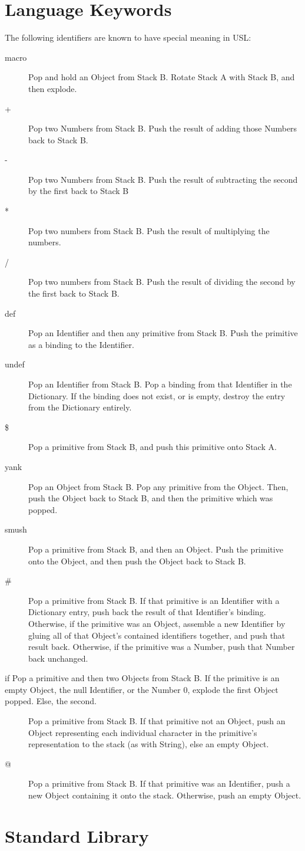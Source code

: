 	\section{Language Keywords}
	The following identifiers are known to have special meaning in USL:
	\begin{description}
		\item[macro] Pop and hold an Object from Stack B. Rotate Stack A with Stack B, and then explode.
		\item[+] Pop two Numbers from Stack B. Push the result of adding those Numbers back to Stack B.
		\item[-] Pop two Numbers from Stack B. Push the result of subtracting the second by the first back to Stack B
		\item[*] Pop two numbers from Stack B. Push the result of multiplying the numbers.
		\item[/] Pop two numbers from Stack B. Push the result of dividing the second by the first back to Stack B.
		\item[def] Pop an Identifier and then any primitive from Stack B. Push the primitive as a binding to the Identifier.
		\item[undef] Pop an Identifier from Stack B. Pop a binding from that Identifier in the Dictionary. If the binding does not exist, or is empty, destroy the entry from the Dictionary entirely.
		\item[\$] Pop a primitive from Stack B, and push this primitive onto Stack A.
		\item[yank] Pop an Object from Stack B. Pop any primitive from the Object. Then, push the Object back to Stack B, and then the primitive which was popped.
		\item[smush] Pop a primitive from Stack B, and then an Object. Push the primitive onto the Object, and then push the Object back to Stack B.
		\item[\#] Pop a primitive from Stack B. If that primitive is an Identifier with a Dictionary entry, push back the result of that Identifier’s binding. Otherwise, if the primitive was an Object, assemble a new Identifier by gluing all of that Object’s contained identifiers together, and push that result back. Otherwise, if the primitive was a Number, push that Number back unchanged.
		\item[if Pop a primitive and then two Objects from Stack B. If the primitive is an empty Object, the null Identifier, or the Number 0, explode the first Object popped. Else, the second.
		\item[obj!] Pop a primitive from Stack B. If that primitive not an Object, push an Object representing each individual character in the primitive’s representation to the stack (as with String), else an empty Object.
		\item[@] Pop a primitive from Stack B. If that primitive was an Identifier, push a new Object containing it onto the stack. Otherwise, push an empty Object.
	\end{description}
	\section{Standard Library}

